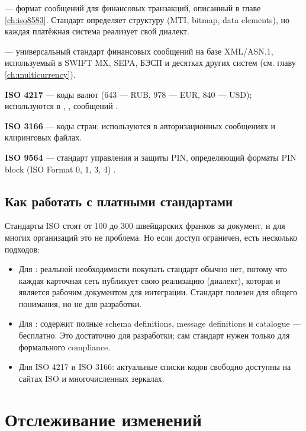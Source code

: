 \textbf{} — формат сообщений для финансовых
транзакций, описанный в главе \ref{ch:iso8583}. Стандарт
определяет структуру (MTI, bitmap, data elements), но каждая
платёжная система реализует свой диалект.

\textbf{} — универсальный стандарт финансовых
сообщений на базе XML/ASN.1, используемый в SWIFT MX,
SEPA, БЭСП и десятках других
систем (см. главу \ref{ch:multicurrency}).

\textbf{ISO 4217} — коды валют (643 — RUB, 978 — EUR,
840 — USD); используются в , , 
сообщений .

\textbf{ISO 3166} — коды стран; используются
в авторизационных сообщениях и клиринговых файлах.

\textbf{ISO 9564} — стандарт управления и защиты PIN,
определяющий форматы PIN block (ISO Format 0, 1, 3,
4) .

\subsection*{Как работать с платными стандартами}

Стандарты ISO стоят от 100 до 300 швейцарских франков
за документ, и для многих организаций это не проблема.
Но если доступ ограничен, есть несколько подходов:

\begin{itemize}
  \item Для : реальной необходимости покупать
        стандарт обычно нет, потому что каждая карточная сеть
        публикует свою реализацию (диалект), которая и является
        рабочим документом для интеграции. Стандарт полезен
        для общего понимания, но не для разработки.
  \item Для :  содержит
        полные schema definitions, message definitions
        и catalogue — бесплатно. Это достаточно для разработки;
        сам стандарт нужен только для формального compliance.
  \item Для ISO 4217 и ISO 3166: актуальные списки кодов
        свободно доступны на сайтах ISO и многочисленных
        зеркалах.
\end{itemize}

\section{Отслеживание изменений}
\label{sec:ps-tracking}

